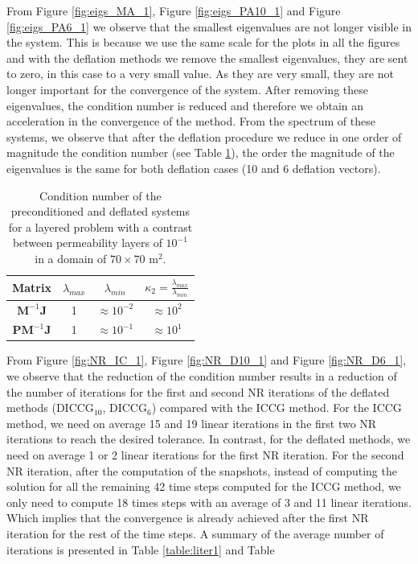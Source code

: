 \documentclass[12pt]{article}
\begin{document}
From Figure \ref{fig:eigs_MA_1}, Figure \ref{fig:eigs_PA10_1} and Figure \ref{fig:eigs_PA6_1} we observe that the smallest eigenvalues are not longer visible in the system. This is because we use the same scale for the plots in all the figures and with the deflation methods we remove the smallest eigenvalues, they are sent to zero, in this case to a very small value. As they are very small, they are not longer important for the convergence of the system. After removing these eigenvalues, the condition number is reduced and therefore we obtain an acceleration in the convergence of the method. From the spectrum of these systems, we observe that after the deflation procedure we reduce in one order of magnitude the condition number (see Table \ref{table:cn_1}), the order the magnitude of the eigenvalues is the same for both deflation cases (10 and 6 deflation vectors).\\
\begin{table}[!h]\centering
\begin{minipage}{.7\textwidth}
\vspace{-10pt}
\centering
\begin{tabular}{ |c|c|c|c|} 
  \hline
 Matrix &$\lambda_{max}$ &$\lambda_{min}$ &$\kappa_2=\frac{\lambda_{max}}{\lambda_{min}}$  \\
  \hline
$\mathbf{M}^{-1}\mathbf{J}$ &1 & $\approx 10^{-2}$&$\approx 10^2$\\
$\mathbf{P}\mathbf{M}^{-1}\mathbf{J}$ &1 & $\approx 10^{-1}$&$\approx 10^1$\\
 \hline
 \end{tabular}
\caption{Condition number of the preconditioned and deflated systems for a layered problem with a contrast between permeability layers of $10^{-1}$ in a domain of $70 \times 70$ m$^2$.}\label{table:cn_1}
\end{minipage}
\end{table}
From Figure \ref{fig:NR_IC_1},  Figure \ref{fig:NR_D10_1} and Figure \ref{fig:NR_D6_1}, we observe that the reduction of the condition number results in a reduction of the number of iterations for the first and second NR iterations of the deflated methods (DICCG$_{10}$, DICCG$_6$) compared with the ICCG method. For the ICCG method, we need on average 15 and 19 linear iterations in the first two NR iterations to reach the desired tolerance. In contrast, for the deflated methods, we need on average 1 or 2 linear iterations for the first NR iteration. For the second NR iteration, after the computation of the snapshots, instead of computing the solution for all the remaining 42 time steps computed for the ICCG method, we only need to compute 18 times steps with an average of 3 and 11 linear iterations. Which implies that the convergence is already achieved after the first NR iteration for the rest of the time steps. A summary of the average number of iterations is presented in Table \ref{table:liter1} and Table \
\end{document}
